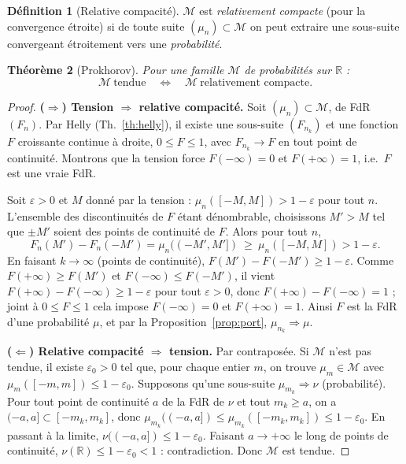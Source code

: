 \documentclass[11pt]{article}
\newcommand{\R}{\mathbb{R}}
\newcommand{\weak}{\Rightarrow}
\theoremstyle{plain}
\newtheorem{theoreme}{Théorème}
\theoremstyle{definition}
\newtheorem{definition}[theoreme]{Définition}
\theoremstyle{remark}
\begin{document}
\begin{definition}[Relative compacité]
$\mathcal M$ est \emph{relativement compacte} (pour la convergence étroite) si de toute suite
$(\mu_n)\subset\mathcal M$ on peut extraire une sous-suite convergeant étroitement vers une
\emph{probabilité}.
\end{definition}

\begin{theoreme}[Prokhorov]\label{th:prok}
Pour une famille $\mathcal M$ de probabilités sur $\R$ :
\[
\mathcal M\ \text{tendue}\quad\Longleftrightarrow\quad\mathcal M\ \text{relativement compacte.}
\]
\end{theoreme}

\begin{proof}
\textbf{($\Rightarrow$) Tension $\Rightarrow$ relative compacité.}
Soit $(\mu_n)\subset\mathcal M$, de FdR $(F_n)$. Par Helly (Th.~\ref{th:helly}), il existe une sous-suite
$(F_{n_k})$ et une fonction $F$ croissante continue à droite, $0\le F\le1$, avec $F_{n_k}\to F$ en tout
point de continuité. Montrons que la tension force $F(-\infty)=0$ et $F(+\infty)=1$, i.e.\ $F$ est
une vraie FdR.

Soit $\varepsilon>0$ et $M$ donné par la tension : $\mu_n([-M,M])>1-\varepsilon$ pour tout $n$.
L'ensemble des discontinuités de $F$ étant dénombrable, choisissons $M'>M$ tel que $\pm M'$ soient des
points de continuité de $F$. Alors pour tout $n$,
\[
F_n(M')-F_n(-M')=\mu_n((-M',M'])\ \ge\ \mu_n([-M,M])>1-\varepsilon.
\]
En faisant $k\to\infty$ (points de continuité), $F(M')-F(-M')\ge1-\varepsilon$. Comme
$F(+\infty)\ge F(M')$ et $F(-\infty)\le F(-M')$, il vient $F(+\infty)-F(-\infty)\ge1-\varepsilon$ pour
tout $\varepsilon>0$, donc $F(+\infty)-F(-\infty)=1$ ; joint à $0\le F\le1$ cela impose
$F(-\infty)=0$ et $F(+\infty)=1$. Ainsi $F$ est la FdR d'une probabilité $\mu$, et par la
Proposition~\ref{prop:port}, $\mu_{n_k}\weak\mu$.

\smallskip
\textbf{($\Leftarrow$) Relative compacité $\Rightarrow$ tension.}
Par contraposée. Si $\mathcal M$ n'est pas tendue, il existe $\varepsilon_0>0$ tel que, pour chaque
entier $m$, on trouve $\mu_m\in\mathcal M$ avec $\mu_m([-m,m])\le1-\varepsilon_0$. Supposons qu'une
sous-suite $\mu_{m_k}\weak\nu$ (probabilité). Pour tout point de continuité $a$ de la FdR de $\nu$ et
tout $m_k\ge a$, on a $(-a,a]\subset[-m_k,m_k]$, donc
$\mu_{m_k}((-a,a])\le\mu_{m_k}([-m_k,m_k])\le1-\varepsilon_0$. En passant à la limite,
$\nu((-a,a])\le1-\varepsilon_0$. Faisant $a\to+\infty$ le long de points de continuité,
$\nu(\R)\le1-\varepsilon_0<1$ : contradiction. Donc $\mathcal M$ est tendue.
\end{proof}
\end{document}
